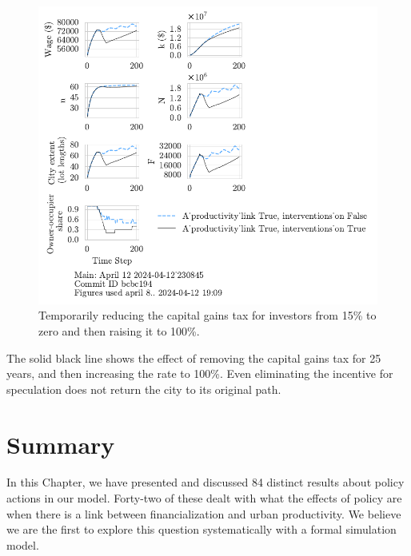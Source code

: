 \begin{figure}[h!tb] 
    \centering
    \includegraphics[scale=1.25, trim={0 1.4cm 5cm 0},clip]{fig/link-interv_CGI-B-pt15_0-50_1-75230845.pdf}%
    \caption[Temporarily reducing the capital gains tax for investors from a low level]{Temporarily reducing the capital gains tax for investors from 15\% to zero and then raising it to 100\%.}
    \label{fig:cgtax_setback2}
\end{figure}


The solid black line shows the effect of removing the capital gains tax for 25 years, and then increasing the rate to 100\%. Even eliminating the incentive for speculation does not return the city to its original path.


\section{Summary}
In this Chapter, we have presented and discussed 84 distinct results about policy actions in our model. Forty-two of these dealt with what the effects of policy are when there is a link between financialization and urban productivity. We believe we are the first to explore this question systematically with a formal simulation model.


